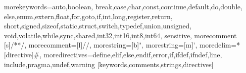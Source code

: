 

%
  {morekeywords={auto,boolean,
      break,case,char,const,continue,default,do,double,%
      else,enum,extern,float,for,goto,if,int,long,register,return,%
      short,signed,sizeof,static,struct,switch,typedef,union,unsigned,%
      void,volatile,while,sync,shared,int32,int16,int8,int64},%
  sensitive,%
  morecomment=[s]{/*}{*/},%
  morecomment=[l]//,%
  morestring=[b]",%
  morestring=[m]',%
  moredelim=*[directive]\#,%
  moredirectives={define,elif,else,endif,error,if,ifdef,ifndef,line,%
  include,pragma,undef,warning}%
}[keywords,comments,strings,directives]%


